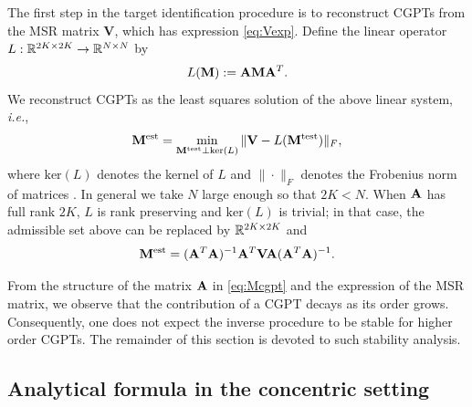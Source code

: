 The first step in the target identification procedure is to
reconstruct CGPTs from the MSR matrix $\mathbf{V}$,
which has expression \eqref{eq:Vexp}. %
Define the linear operator $L: \R^{2K \times 2K} \to \R^{N\times
N}$ by
\begin{equation}
L(\mathbf{M}) := \mathbf{A} \mathbf{M} \mathbf{A}^T. \label{eq:linsys}
\end{equation}
We reconstruct CGPTs as the least squares solution of the above
linear system, \emph{i.e.},
\begin{equation}
\mathbf{M}^{\mathrm{est}} = \min_{\mathbf{M}^{\mathrm{test}} \perp
\mathrm{ker } (L)} \| \mathbf{V} - L(\mathbf{M}^{\mathrm{test}})
\|_{F}, \label{eq:lsqr-GPT-reconstruction}
\end{equation}
where $\mathrm{ker } (L)$ denotes the kernel of $L$ and
$\|\cdot\|_F$ denotes the Frobenius norm of matrices \cite{LH95}.
In general we take $N$ large enough so that $2K <N$. When $\mathbf{A}$
has full rank $2K$, $L$ is rank preserving and $\mathrm{ker }(L)$
is trivial; in that case, the admissible set above can be replaced
by $\R^{2K\times 2K}$ and $$ \mathbf{M}^{\mathrm{est}} =   (\mathbf{A}^T
\mathbf{A})^{-1} \mathbf{A}^T \mathbf{V} \mathbf{A} (\mathbf{A}^T \mathbf{A})^{-1}.$$

From the structure of the matrix $\mathbf{A}$ in \eqref{eq:Mcgpt} and
the expression of the MSR matrix, we observe that the contribution
of a CGPT decays as its order grows. Consequently, one does not
expect the inverse procedure to be stable for higher order CGPTs.
The remainder of this section is devoted to such stability
analysis.

\subsection{Analytical formula in the concentric setting}

